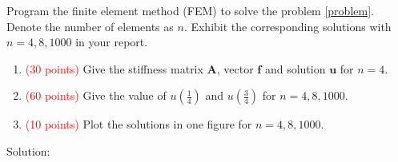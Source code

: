 \documentclass[english,onecolumn]{IEEEtran}
\begin{document}
Program the finite element method (FEM) to solve the problem \eqref{problem}. Denote the number of elements as $n$. Exhibit the corresponding solutions with $n = 4, 8, 1000$ in your report. 
\begin{enumerate}
    \item \textcolor{red}{(30 points)} Give the stiffness matrix $\boldsymbol{A}$, vector $\mathbf{f}$ and solution $\mathbf{u}$ for $n = 4$.
    \item \textcolor{red}{(60 points)} Give the value of $u(\frac{1}{4})$ and $u(\frac{3}{4})$ for $n = 4, 8, 1000$.
    \item \textcolor{red}{(10 points)} Plot the solutions in one figure for $n = 4, 8, 1000$.
\end{enumerate} 

Solution: \\
\end{document}

